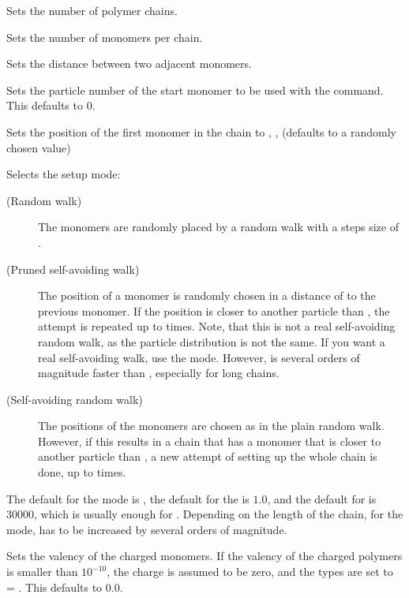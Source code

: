 \begin{arguments}
\item[\var{num_polymers}] Sets the number of polymer chains.
\item[\var{monomers_per_chain}] Sets the number of monomers per
  chain.
\item[\var{bond_length}] Sets the distance between two adjacent
  monomers.
\item[\opt{start \var{part_id}}] Sets the particle number of the
  start monomer to be used with the  command. This
  defaults to 0.

\item[\opt{pos \var{x} \var{y} \var{z}}] Sets the position of the
  first monomer in the chain to , ,  (defaults to
  a randomly chosen value)
  
\item[\opt{mode \alt{RW  \asep  PSAW  \asep  SAW} \opt{\var{shield}
      \opt{\var{max_try}}}}]
  Selects the setup mode:
  \begin{description}
  \item[ (Random walk)] The monomers are
    randomly placed by a random walk with a steps size of
    .
  \item[ (Pruned self-avoiding walk)] The position of a
    monomer is randomly chosen in a distance of  to
    the previous monomer. If the position is closer to another
    particle than , the attempt is repeated up to
     times. Note, that this is not a real self-avoiding
    random walk, as the particle distribution is not the same. If you
    want a real self-avoiding walk, use the  mode.
    However,  is several orders of magnitude faster than
    , especially for long chains.
  \item[ (Self-avoiding random walk)] The positions of
    the monomers are chosen as in the plain random walk. However, if
    this results in a chain that has a monomer that is closer to
    another particle than , a new attempt of setting up
    the whole chain is done, up to  times.
  \end{description}
  The default for the mode is , the default for the
   is $1.0$, and the default for  is
  $30000$, which is usually enough for . Depending on
  the length of the chain, for the  mode, 
  has to be increased by several orders of magnitude.
\item[\opt{charge \var{val_charged_monomer}}] Sets the valency of
  the charged monomers.  If the valency of the charged polymers
   is smaller than $10^{-10}$, the charge
  is assumed to be zero, and the types are set to
   = . This
  defaults to 0.0.


\end{arguments}
